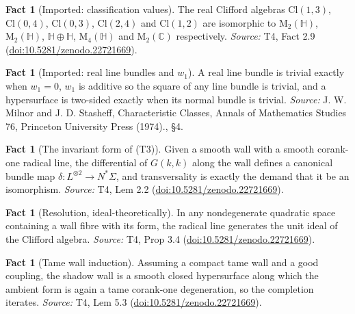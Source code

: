 \documentclass[11pt]{article}
\theoremstyle{definition}
\newtheorem{fact}[theorem]{Fact}
\theoremstyle{plain}
\providecommand{\C}{}\renewcommand{\C}{\mathbb{C}}
\providecommand{\Cl}{}\renewcommand{\Cl}{\mathrm{Cl}}
\providecommand{\HH}{}\renewcommand{\HH}{\mathbb{H}}
\providecommand{\Mat}{}\renewcommand{\Mat}{\mathrm{M}}
\providecommand{\Sig}{}\renewcommand{\Sig}{\Sigma}
\providecommand{\shL}{}\renewcommand{\shL}{L}
\begin{document}
\begin{fact}[Imported: classification values]\label{c:sheaf.imported-classification-values}
The real Clifford algebras $\Cl(1,3)$, $\Cl(0,4)$, $\Cl(0,3)$, $\Cl(2,4)$ and $\Cl(1,2)$ are isomorphic to $\Mat_2(\HH)$, $\Mat_2(\HH)$, $\HH \oplus \HH$, $\Mat_4(\HH)$ and $\Mat_2(\C)$ respectively.
\emph{Source:} T4, Fact 2.9 (\href{https://doi.org/10.5281/zenodo.22721669}{doi:10.5281/zenodo.22721669}).
\end{fact}

\begin{fact}[Imported: real line bundles and $w_1$]\label{c:sheaf.imported-real-line-bundles}
A real line bundle is trivial exactly when $w_1 = 0$, $w_1$ is additive so the square of any line bundle is trivial, and a hypersurface is two-sided exactly when its normal bundle is trivial.
\emph{Source:} J. W. Milnor and J. D. Stasheff, Characteristic Classes, Annals of Mathematics Studies 76, Princeton University Press (1974)., \S 4.
\end{fact}

\begin{fact}[The invariant form of (T3)]\label{c:sheaf.invariant-form-t3}
Given a smooth wall with a smooth corank-one radical line, the differential of $G(k,k)$ along the wall defines a canonical bundle map $\delta : \shL^{\otimes 2} \to N^*\Sig$, and transversality is exactly the demand that it be an isomorphism.
\emph{Source:} T4, Lem 2.2 (\href{https://doi.org/10.5281/zenodo.22721669}{doi:10.5281/zenodo.22721669}).
\end{fact}

\begin{fact}[Resolution, ideal-theoretically]\label{c:sheaf.resolution-ideal-theoretically}
In any nondegenerate quadratic space containing a wall fibre with its form, the radical line generates the unit ideal of the Clifford algebra.
\emph{Source:} T4, Prop 3.4 (\href{https://doi.org/10.5281/zenodo.22721669}{doi:10.5281/zenodo.22721669}).
\end{fact}

\begin{fact}[Tame wall induction]\label{c:sheaf.tame-wall-induction}
Assuming a compact tame wall and a good coupling, the shadow wall is a smooth closed hypersurface along which the ambient form is again a tame corank-one degeneration, so the completion iterates.
\emph{Source:} T4, Lem 5.3 (\href{https://doi.org/10.5281/zenodo.22721669}{doi:10.5281/zenodo.22721669}).
\end{fact}
\end{document}
